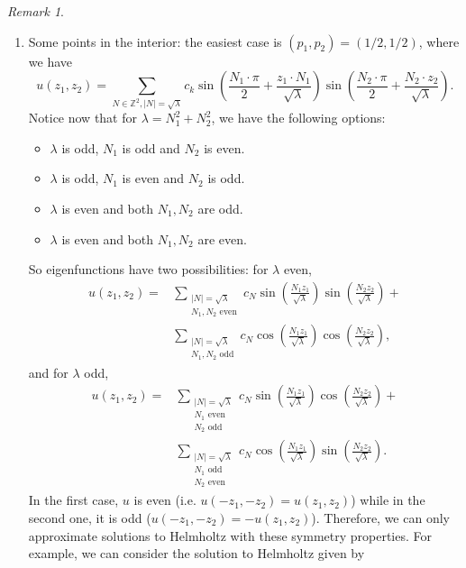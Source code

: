 \documentclass{amsart}
\theoremstyle{definition}
\theoremstyle{remark}
\newtheorem{remark}[theorem]{Remark}
\numberwithin{equation}{section}
\theoremstyle{definition}
\theoremstyle{remark}
\begin{document}
\begin{remark}
\begin{enumerate}
	\item Some points in the interior: the easiest case is $(p_1,p_2)=(1/2,1/2)$, where we have  \begin{equation}
		u(z_1,z_2)=\sum_{N\in\mathbb{Z}^2, |N|=\sqrt{\lambda}}c_k\sin\left(\frac{N_1\cdot\pi }{2}+\frac{z_1\cdot N_1}{\sqrt{\lambda}}\right)\sin\left(\frac{N_2\cdot\pi }{2}+\frac{N_2\cdot z_2}{\sqrt{\lambda}}\right).
	\end{equation}
	Notice now that for $\lambda=N_1^2+N_2^2$, we have the following options:\begin{itemize}
		\item $\lambda$ is odd, $N_1$ is odd and $N_2$ is even.
		\item  $\lambda$ is odd, $N_1$ is even and $N_2$ is odd.
		\item $\lambda$ is even and both $N_1,N_2$ are odd.
		\item $\lambda$ is even and both $N_1,N_2$ are even. 
	\end{itemize}
	So eigenfunctions have two possibilities: for $\lambda$ even,  \begin{equation}\begin{aligned}
	    \label{evenpi2}
		u(z_1,z_2)=&\sum_{\substack{|N|=\sqrt{\lambda}\\ N_1,N_2\text{ even}}}c_N\sin\left(\frac{N_1 z_1}{\sqrt{\lambda}}\right)\sin\left(\frac{N_2 z_2}{\sqrt{\lambda}}\right)+\\&\sum_{\substack{|N|=\sqrt{\lambda}\\ N_1,N_2\text{ odd}}}c_N\cos\left(\frac{N_1 z_1}{\sqrt{\lambda}}\right)\cos\left(\frac{N_2 z_2}{\sqrt{\lambda}}\right),
	\end{aligned}
	\end{equation}and for $\lambda$ odd,
	\begin{equation}
		\begin{aligned}
		    u(z_1,z_2)=&\sum_{\substack{|N|=\sqrt{\lambda}\\ N_1\text{ even }\\ N_2\text{ odd}}}c_N\sin\left(\frac{N_1 z_1}{\sqrt{\lambda}}\right)\cos\left(\frac{N_2 z_2}{\sqrt{\lambda}}\right)+\\&\sum_{\substack{|N|=\sqrt{\lambda}\\ N_1\text{ odd}\\ N_2\text{ even }}}c_N\cos\left(\frac{N_1 z_1}{\sqrt{\lambda}}\right)\sin\left(\frac{N_2 z_2}{\sqrt{\lambda}}\right).
		\end{aligned}
	\end{equation} In the first case, $u$ is even (i.e. $u(-z_1,-z_2)=u(z_1,z_2)$) while in the second one, it is odd ($u(-z_1,-z_2)=-u(z_1,z_2)$). Therefore, we can only approximate solutions to Helmholtz with these symmetry properties. For example, we can consider the solution to Helmholtz given by\begin{equation}

\end{equation}
\end{enumerate}
\end{remark}
\end{document}
